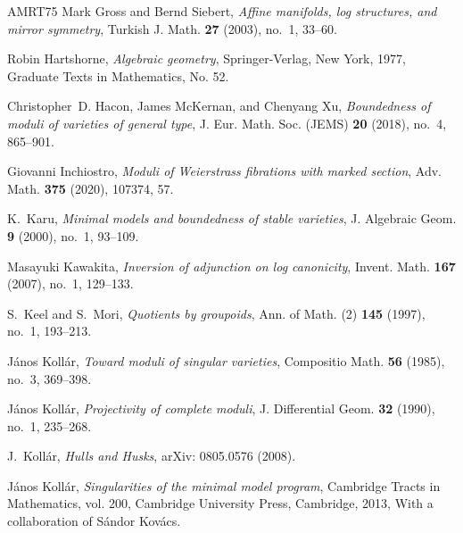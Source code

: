\documentclass[table,x11names]{amsart}
\begin{document}
\begin{thebibliography}{AMRT75}
Mark Gross and Bernd Siebert, \emph{Affine manifolds, log structures, and
  mirror symmetry}, Turkish J. Math. \textbf{27} (2003), no.~1, 33--60.

Robin Hartshorne, \emph{{A}lgebraic geometry}, Springer-Verlag, New York, 1977,
  Graduate Texts in Mathematics, No. 52. 

Christopher~D. Hacon, James McKernan, and Chenyang Xu, \emph{Boundedness of
  moduli of varieties of general type}, J. Eur. Math. Soc. (JEMS) \textbf{20}
  (2018), no.~4, 865--901. 

Giovanni Inchiostro, \emph{Moduli of {W}eierstrass fibrations with marked
  section}, Adv. Math. \textbf{375} (2020), 107374, 57. 

K.~Karu, \emph{{M}inimal models and boundedness of stable varieties}, J.
  Algebraic Geom. \textbf{9} (2000), no.~1, 93--109. 

Masayuki Kawakita, \emph{Inversion of adjunction on log canonicity}, Invent.
  Math. \textbf{167} (2007), no.~1, 129--133. 

S.~Keel and S.~Mori, \emph{{Q}uotients by groupoids}, Ann. of Math. (2)
  \textbf{145} (1997), no.~1, 193--213. 

J\'{a}nos Koll\'{a}r, \emph{Toward moduli of singular varieties}, Compositio
  Math. \textbf{56} (1985), no.~3, 369--398. 

J\'anos Koll\'ar, \emph{Projectivity of complete moduli}, J. Differential Geom.
  \textbf{32} (1990), no.~1, 235--268. 

J.~Koll{\'a}r, \emph{{H}ulls and {H}usks}, arXiv: 0805.0576 (2008).

J\'anos Koll\'ar, \emph{Singularities of the minimal model program}, Cambridge
  Tracts in Mathematics, vol. 200, Cambridge University Press, Cambridge, 2013,
  With a collaboration of S\'andor Kov\'acs. 


\end{thebibliography}
\end{document}
